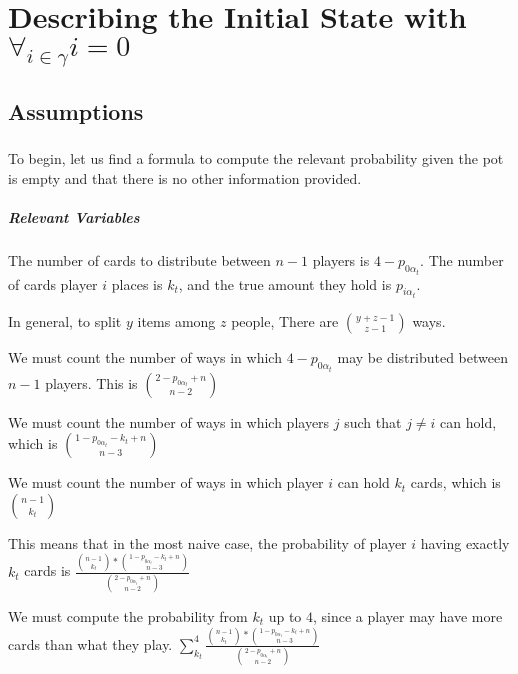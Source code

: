\documentclass[letterpaper,11pt]{report}
\begin{document}
\chapter{Describing the Initial State with $\forall_{i\in\gamma} i = 0$}
\section{Assumptions} 
\paragraph*{} To begin, let us find a formula to compute the relevant probability given the pot is empty and that there is no other information provided.
\paragraph*{Relevant Variables} The number of cards to distribute between $n-1$ players is $4-p_{0 \alpha_{t}}$. The number of cards player $i$ places is $k_t$, and the true amount they hold is $p_{i \alpha_t}$.
\begin{description}
    \item In general, to split $y$ items among $z$ people, There are ${y+z-1 \choose z-1}$ ways.
    \item We must count the number of ways in which $4-p_{0 \alpha_{t}}$ may be distributed between $n-1$ players. This is ${2-p_{0 \alpha_{t}} + n \choose n-2}$
    \item We must count the number of ways in which players $j$ such that $j\neq i$ can hold, which is ${1-p_{0 \alpha_{t}} - k_t + n \choose n-3}$ 
    \item We must count the number of ways in which player $i$ can hold $k_t$ cards, which is ${n-1 \choose k_t}$
    \linebreak
    \item This means that in the most naive case, the probability of player $i$ having exactly $k_t$ cards is  $\frac{{n-1 \choose k_t}\ast{1-p_{0 \alpha_{t}} - k_t + n \choose n-3}}{{2-p_{0 \alpha_{t}} + n \choose n-2}}$
    \item We must compute the probability from $k_t$ up to $4$, since a player may have more cards than what they play. $\sum\limits_{k_t}^{4} \frac{{n-1 \choose k_t}\ast{1-p_{0 \alpha_{t}} - k_t + n \choose n-3}}{{2-p_{0 \alpha_{t}} + n \choose n-2}}$ 
\end{description}
\end{document}
